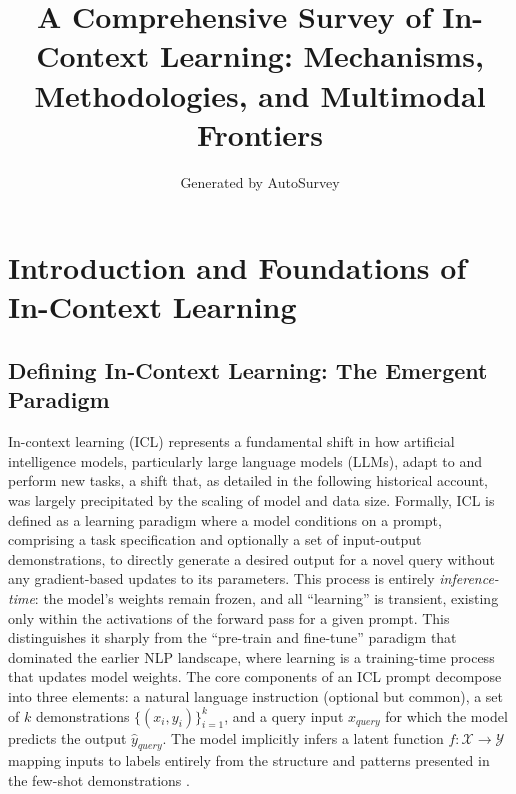 \documentclass[11pt]{article}
\title{A Comprehensive Survey of In-Context Learning: Mechanisms, Methodologies, and Multimodal Frontiers}
\author{Generated by AutoSurvey}
\date{}
\begin{document}
\maketitle
\tableofcontents
\newpage

\section{Introduction and Foundations of In-Context Learning}

\subsection{Defining In-Context Learning: The Emergent Paradigm}

In-context learning (ICL) represents a fundamental shift in how artificial intelligence models, particularly large language models (LLMs), adapt to and perform new tasks, a shift that, as detailed in the following historical account, was largely precipitated by the scaling of model and data size. Formally, ICL is defined as a learning paradigm where a model conditions on a prompt, comprising a task specification and optionally a set of input-output demonstrations, to directly generate a desired output for a novel query without any gradient-based updates to its parameters. This process is entirely \emph{inference-time}: the model's weights remain frozen, and all ``learning'' is transient, existing only within the activations of the forward pass for a given prompt. This distinguishes it sharply from the ``pre-train and fine-tune'' paradigm that dominated the earlier NLP landscape, where learning is a training-time process that updates model weights. The core components of an ICL prompt decompose into three elements: a natural language instruction (optional but common), a set of \(k\) demonstrations \(\{(x_i, y_i)\}_{i=1}^k\), and a query input \(x_{query}\) for which the model predicts the output \(\hat{y}_{query}\). The model implicitly infers a latent function \(f: \mathcal{X} \to \mathcal{Y}\) mapping inputs to labels entirely from the structure and patterns presented in the few-shot demonstrations \cite{ref1,ref2}.
\end{document}
